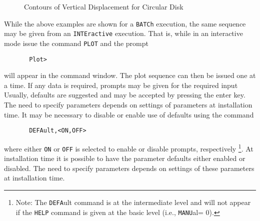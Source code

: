 \begin{figure}
\epsfxsize=4.8in
\centerline {\hfil {} \hfil}
\caption{Contours of Vertical Displacement for Circular Disk}
\label{fig8a}
\end{figure}

While the above examples are shown for a {\tt BATCh} execution, the same
sequence may be given from an {\tt INTEractive} execution.  That is,
while in an interactive mode issue the command {\tt PLOT} and the prompt
\begin{verbatim}
       Plot>
\end{verbatim}
will appear in the command window.
The plot sequence can then be issued one at a time.  If any
data is required, prompts may be given for the required input
Usually, defaults are suggested and may be accepted by pressing the enter key.
The need to specify parameters depends on
settings of parameters at installation time.
It may be necessary to disable or enable use of defaults using the command
\begin{verbatim}
       DEFAult,<ON,OFF>
\end{verbatim}
where either {\tt ON} or {\tt OFF} is selected to enable or disable prompts,
respectively
{\footnote{Note: The {\tt DEFA}ult command is at the intermediate level
and will not appear if the {\tt HELP} command is given at the basic level
(i.e., {\tt MANU}al= 0).}}.
At installation time it is possible to have the parameter defaults either
enabled or disabled.
The need to specify parameters depends on
settings of these parameters at installation time.
